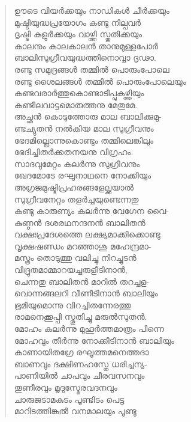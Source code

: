 \begin{verse}
ഊടെ വിയര്‍ക്കയും നാഡികള്‍ ചീര്‍ക്കയും\\
മുഷ്ടിയുദ്ധപ്രയോഗം കണ്ടു നില്പവര്‍\\
ദൃഷ്ടി കുളുര്‍ക്കയും വാഴ്ത്തി സ്തുതിക്കയും\\
കാലനും കാലകാലന്‍ താനുമുള്ളപോര്‍\\
ബാലിസുഗ്രീവയുദ്ധത്തിനൊവ്വാ ദൃഢാ.\\
രണ്ടു സമുദ്രങ്ങള്‍ തമ്മില്‍ പൊരുംപോലെ\\
രണ്ടു ശൈലങ്ങള്‍ തമ്മില്‍ പൊരുംപോലെയും\\
കണ്ടവരാര്‍ത്തുകൊണ്ടാടിപ്പുകഴ്ത്തിയും\\
കണ്ടീലവാട്ടമൊരുത്തനു മേതുമേ.\\
അച്ഛന്‍ കൊടുത്തോരു മാല ബാലിക്കുമു-\\
ണ്ടച്യുതന്‍ നല്‍കിയ മാല സുഗ്രീവനും\\
ഭേദമില്ലൊന്നുകൊണ്ടും തമ്മിലെങ്കിലും\\
ഭേദിച്ചിതര്‍ക്കതനയനു വിഗ്രഹം.\\
സാദവുമേറ്റം കലര്‍ന്നു സുഗ്രീവനും\\
ഖേദമോടേ രഘുനാഥനെ നോക്കിയും\\
അഗ്രജമുഷ്ടിപ്രഹരങ്ങളേല്ക്കയാല്‍\\
സുഗ്രീവനേറ്റം തളര്‍ച്ചയുണ്ടെന്നതു\\
കണ്ടു കാരുണ്യം കലര്‍ന്നു വേഗേന വൈ-\\
കുണ്ഠന്‍ ദശരഥനന്ദനന്‍ ബാലിതന്‍\\
വക്ഷഃപ്രദേശത്തെ ലക്ഷ്യമാക്കിക്കൊണ്ടു\\
വൃക്ഷഷണ്ഡം മറഞ്ഞാശു മഹേന്ദ്രമാ-\\
മസ്ത്രം തൊടുത്തു വലിച്ചു നിറച്ചുടന്‍\\
വിദ്രുതമാമ്മാറയച്ചരുളീടിനാന്‍,\\
ചെന്നതു ബാലിതന്‍ മാറില്‍ തറച്ചള-\\
വൊന്നങ്ങലറി വീണീടിനാന്‍ ബാലിയും\\
ഭൂമിയുമൊന്നു വിറച്ചിതന്നേരത്തു\\
രാമനെക്കൂപ്പി സ്തുതിച്ചു മരുല്‍സുതന്‍.\\
മോഹം കലര്‍ന്നു മുഹൂര്‍ത്തമാത്രം പിന്നെ\\
മോഹവും തീര്‍ന്നു നോക്കീടിനാന്‍ ബാലിയും\\
കാണായിതഗ്രേ രഘൂത്തമനെത്തദാ\\
ബാണവും ദക്ഷിണഹസ്തേ ധരിച്ചന്യ-\\
പാണിയില്‍ ചാപവും ചീരവസനവും\\
തൂണീരവും മൃദുസ്മേരവദനവും\\
ചാരുജടാമകുടം പൂണ്ടിടം പെട്ട\\
മാറിടത്തിങ്കല്‍ വനമാലയും പൂണ്ടു\\

\end{verse}

